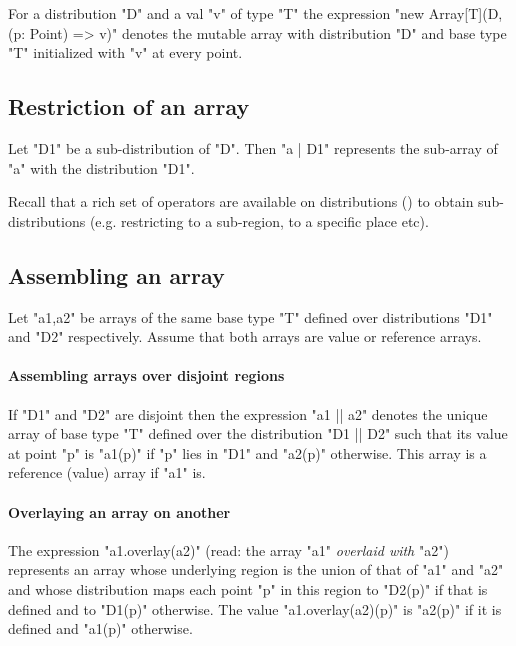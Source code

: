 For a distribution \xcd"D" and a val \xcd"v" of
type \xcd"T" the expression \xcd"new Array[T](D, (p: Point) => v)"
denotes the mutable array with
distribution \xcd"D" and base type \xcd"T" initialized with \xcd"v"
at every point.

\subsection{Restriction of an array}

Let \xcd"D1" be a sub-distribution of \xcd"D". Then \xcd"a | D1"
represents the sub-array of \xcd"a" with the distribution \xcd"D1".

Recall that a rich set of operators are available on distributions
() to obtain sub-distributions
(e.g. restricting to a sub-region, to a specific place etc).

\subsection{Assembling an array}
Let \xcd"a1,a2" be arrays of the same base type \xcd"T" defined over
distributions \xcd"D1" and \xcd"D2" respectively. Assume that both
arrays are value or reference arrays. 
\paragraph{Assembling arrays over disjoint regions}

If \xcd"D1" and \xcd"D2" are disjoint then the expression \xcd"a1 || a2" denotes the unique array of base type \xcd"T" defined over the
distribution \xcd"D1 || D2" such that its value at point \xcd"p" is
\xcd"a1(p)" if \xcd"p" lies in \xcd"D1" and \xcd"a2(p)"
otherwise. This array is a reference (value) array if \xcd"a1" is.

\paragraph{Overlaying an array on another}
The expression
\xcd"a1.overlay(a2)" (read: the array \xcd"a1" {\em overlaid with} \xcd"a2")
represents an array whose underlying region is the union of that of
\xcd"a1" and \xcd"a2" and whose distribution maps each point \xcd"p"
in this region to \xcd"D2(p)" if that is defined and to \xcd"D1(p)"
otherwise. The value \xcd"a1.overlay(a2)(p)" is \xcd"a2(p)" if it is defined and \xcd"a1(p)" otherwise.

